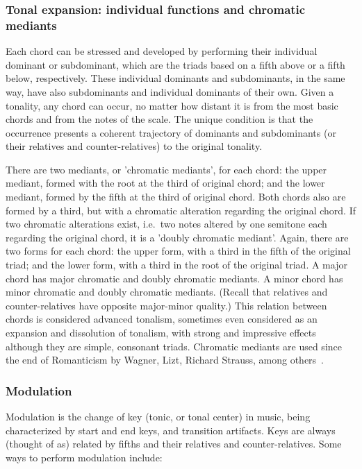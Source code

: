 \subsubsection{Tonal expansion: individual functions and chromatic mediants}
Each chord can be stressed and developed by performing their individual dominant or subdominant, which are the triads based
on a fifth above or a fifth below, respectively. These individual dominants and subdominants,
in the same way, have also subdominants and individual dominants of their own. Given a tonality, any chord can occur, no matter
how distant it is from the most basic chords and from the notes of the scale. The unique condition is that the occurrence presents a coherent trajectory of dominants and subdominants (or their relatives and counter-relatives) to the original tonality.

There are two mediants, or 'chromatic mediants', for each chord: the upper
mediant, formed with the root at the third of original chord; and the lower mediant, formed by the fifth at the third of original chord.
Both chords also are formed by a third, but with a chromatic alteration regarding the original chord. If two chromatic alterations exist, i.e.\ two notes altered by one semitone each regarding the original chord, it is a 'doubly chromatic mediant'. Again, there are two forms for each chord: the upper form, with a third in the fifth of the original triad; and the lower form, with a third in the root
of the original triad. A major chord has major chromatic and doubly chromatic mediants. A minor chord has minor chromatic and doubly chromatic mediants. (Recall that relatives and counter-relatives have opposite major-minor quality.)
This relation between chords is considered advanced tonalism, sometimes even considered as an expansion and dissolution of tonalism,
with strong and impressive effects although they are simple, consonant triads. Chromatic mediants are used since the end of Romanticism by Wagner, Lizt, Richard Strauss, among others~\cite{Harmonia,Salzer}. 


\subsubsection{Modulation}
Modulation is the change of key (tonic, or tonal center) in music, being characterized by start and end keys, and transition artifacts.
Keys are always (thought of as) related by fifths and their relatives and counter-relatives. Some ways to perform modulation include:


